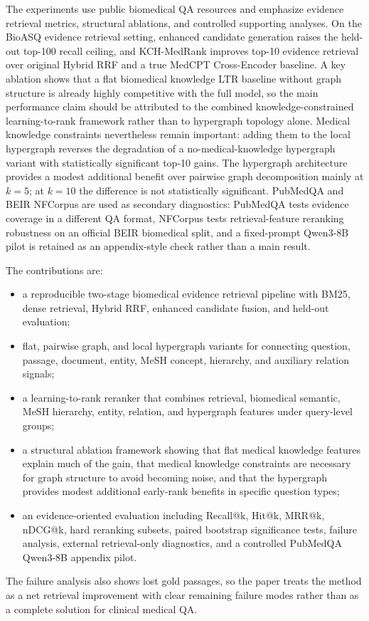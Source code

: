 The experiments use public biomedical QA resources and emphasize evidence retrieval metrics, structural ablations, and controlled supporting analyses. On the BioASQ evidence retrieval setting, enhanced candidate generation raises the held-out top-100 recall ceiling, and KCH-MedRank improves top-10 evidence retrieval over original Hybrid RRF and a true MedCPT Cross-Encoder baseline. A key ablation shows that a flat biomedical knowledge LTR baseline without graph structure is already highly competitive with the full model, so the main performance claim should be attributed to the combined knowledge-constrained learning-to-rank framework rather than to hypergraph topology alone. Medical knowledge constraints nevertheless remain important: adding them to the local hypergraph reverses the degradation of a no-medical-knowledge hypergraph variant with statistically significant top-10 gains. The hypergraph architecture provides a modest additional benefit over pairwise graph decomposition mainly at $k{=}5$; at $k{=}10$ the difference is not statistically significant. PubMedQA and BEIR NFCorpus are used as secondary diagnostics: PubMedQA tests evidence coverage in a different QA format, NFCorpus tests retrieval-feature reranking robustness on an official BEIR biomedical split, and a fixed-prompt Qwen3-8B pilot is retained as an appendix-style check rather than a main result.

The contributions are:
\begin{itemize}
  \item a reproducible two-stage biomedical evidence retrieval pipeline with BM25, dense retrieval, Hybrid RRF, enhanced candidate fusion, and held-out evaluation;
  \item flat, pairwise graph, and local hypergraph variants for connecting question, passage, document, entity, MeSH concept, hierarchy, and auxiliary relation signals;
  \item a learning-to-rank reranker that combines retrieval, biomedical semantic, MeSH hierarchy, entity, relation, and hypergraph features under query-level groups;
  \item a structural ablation framework showing that flat medical knowledge features explain much of the gain, that medical knowledge constraints are necessary for graph structure to avoid becoming noise, and that the hypergraph provides modest additional early-rank benefits in specific question types;
  \item an evidence-oriented evaluation including Recall@k, Hit@k, MRR@k, nDCG@k, hard reranking subsets, paired bootstrap significance tests, failure analysis, external retrieval-only diagnostics, and a controlled PubMedQA Qwen3-8B appendix pilot.
\end{itemize}

The failure analysis also shows lost gold passages, so the paper treats the method as a net retrieval improvement with clear remaining failure modes rather than as a complete solution for clinical medical QA.
